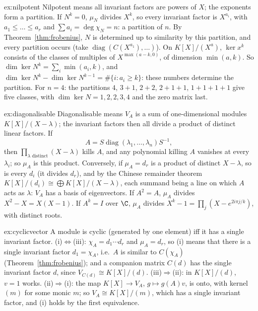\begin{solution}{ex:nilpotent}
\idea Nilpotent means all invariant factors are powers of $X$; the exponents form a partition.
\writeup If $N^k=0$, $\mu_N$ divides $X^k$, so every invariant factor is $X^{a_i}$, with $a_1\le\dots\le a_r$ and $\sum a_i=\deg\chi_N=n$: a partition of $n$. By Theorem~\ref{thm:frobenius}, $N$ is determined up to similarity by this partition, and every partition occurs (take $\operatorname{diag}(C(X^{a_1}),\dots)$). On $K[X]/(X^a)$, $\ker x^k$ consists of the classes of multiples of $X^{\max(a-k,0)}$, of dimension $\min(a,k)$. So $\dim\ker N^k=\sum_i\min(a_i,k)$, and $\dim\ker N^k-\dim\ker N^{k-1}=\#\{i:a_i\ge k\}$: these numbers determine the partition. For $n=4$: the partitions $4$, $3+1$, $2+2$, $2+1+1$, $1+1+1+1$ give five classes, with $\dim\ker N=1,2,2,3,4$ and the zero matrix last.
\end{solution}

\begin{solution}{ex:diagonalisable}
\idea Diagonalisable means $V_A$ is a sum of one-dimensional modules $K[X]/(X-\lambda)$; the invariant factors then all divide a product of distinct linear factors.
\writeup If
\[
A=S\operatorname{diag}(\lambda_1,\dots,\lambda_n)S^{-1},
\]
then $\prod_{\lambda\text{ distinct}}(X-\lambda)$ kills $A$, and any polynomial killing $A$ vanishes at every $\lambda_i$; so $\mu_A$ is this product. Conversely, if $\mu_A=d_r$ is a product of distinct $X-\lambda$, so is every $d_i$ (it divides $d_r$), and by the Chinese remainder theorem $K[X]/(d_i)\cong\bigoplus K[X]/(X-\lambda)$, each summand being a line on which $A$ acts as $\lambda$: $V_A$ has a basis of eigenvectors. If $A^2=A$, $\mu_A$ divides $X^2-X=X(X-1)$. If $A^k=I$ over $\C$, $\mu_A$ divides $X^k-1=\prod_{j}(X-e^{2i\pi j/k})$, with distinct roots.
\end{solution}

\begin{solution}{ex:cyclicvector}
\idea A module is cyclic (generated by one element) iff it has a single invariant factor.
\writeup (i)$\Leftrightarrow$(iii): $\chi_A=d_1\cdots d_r$ and $\mu_A=d_r$, so (i) means that there is a single invariant factor $d_1=\chi_A$, i.e.\ $A$ is similar to $C(\chi_A)$ (Theorem~\ref{thm:frobenius}); and a companion matrix $C(d)$ has the single invariant factor $d$, since $V_{C(d)}\cong K[X]/(d)$. (iii)$\Rightarrow$(ii): in $K[X]/(d)$, $v=1$ works. (ii)$\Rightarrow$(i): the map $K[X]\to V_A$, $g\mapsto g(A)v$, is onto, with kernel $(m)$ for some monic $m$; so $V_A\cong K[X]/(m)$, which has a single invariant factor, and (i) holds by the first equivalence.
\end{solution}

